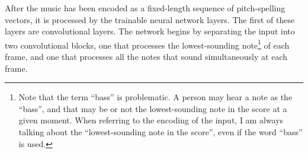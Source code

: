 
After the music has been encoded as a fixed-length sequence
of pitch-spelling vectors, it is processed by the trainable
neural network layers. The first of these layers are
convolutional layers. The network begins by separating the
input into two convolutional blocks, one that processes the
lowest-sounding note\footnote{Note that the term ``bass'' is
problematic. A person may hear a note as the ``bass'', and
that may be or not the lowest-sounding note in the score at
a given moment. When referring to the encoding of the input,
I am always talking about the ``lowest-sounding note in the
score'', even if the word ``bass'' is used.} of each
\gls{frame}, and one that processes all the notes that sound
simultaneously at each frame.
